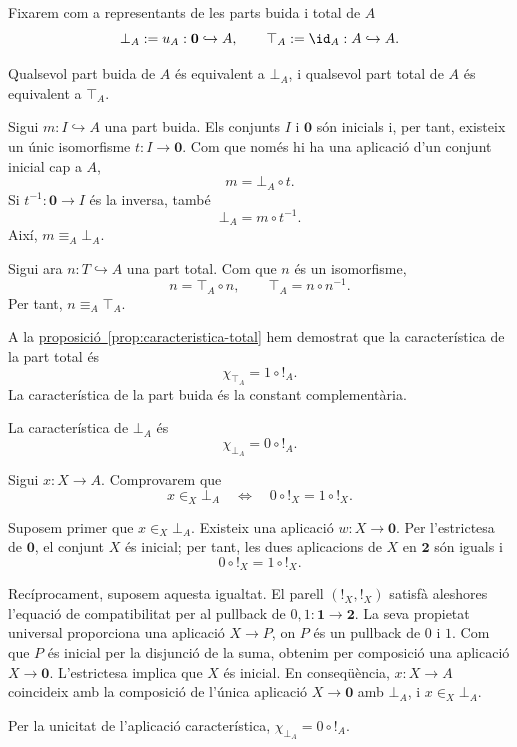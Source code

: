 \begin{notacio}\label{not:parts-extremals}
Fixarem com a representants de les parts buida i total de \(A\)
\[
\bot_A:=u_A:\mathbf0\hookrightarrow A,
\qquad
\top_A:=\id_A:A\hookrightarrow A.
\]
\end{notacio}

\begin{proposicio}\label{prop:parts-extremals-uniques}
Qualsevol part buida de \(A\) és equivalent a \(\bot_A\), i qualsevol
part total de \(A\) és equivalent a \(\top_A\).
\end{proposicio}

\begin{prova}
Sigui \(m:I\hookrightarrow A\) una part buida. Els conjunts \(I\) i
\(\mathbf0\) són inicials i, per tant, existeix un únic isomorfisme
\(t:I\to\mathbf0\). Com que només hi ha una aplicació d'un conjunt
inicial cap a \(A\),
\[
m=\bot_A\circ t.
\]
Si \(t^{-1}:\mathbf0\to I\) és la inversa, també
\[
\bot_A=m\circ t^{-1}.
\]
Així, \(m\equiv_A\bot_A\).

Sigui ara \(n:T\hookrightarrow A\) una part total. Com que \(n\) és un
isomorfisme,
\[
n=\top_A\circ n,
\qquad
\top_A=n\circ n^{-1}.
\]
Per tant, \(n\equiv_A\top_A\).
\end{prova}

A la \hyperref[prop:caracteristica-total]{proposició~\ref*{prop:caracteristica-total}} hem demostrat que la característica de la part total és
\[
\chi_{\top_A}=1\circ {!}_A.
\]
La característica de la part buida és la constant complementària.

\begin{proposicio}\label{prop:caracteristica-buida}
La característica de \(\bot_A\) és
\[
\chi_{\bot_A}=0\circ {!}_A.
\]
\end{proposicio}

\begin{prova}
Sigui \(x:X\to A\). Comprovarem que
\[
x\in_X\bot_A
\quad\Longleftrightarrow\quad
0\circ {!}_X=1\circ {!}_X.
\]

Suposem primer que \(x\in_X\bot_A\). Existeix una aplicació
\(w:X\to\mathbf0\). Per l'estrictesa de \(\mathbf0\), el conjunt
\(X\) és inicial; per tant, les dues aplicacions de \(X\) en
\(\mathbf2\) són iguals i
\[
0\circ {!}_X=1\circ {!}_X.
\]

Recíprocament, suposem aquesta igualtat. El parell
\(({!}_X,{!}_X)\) satisfà aleshores l'equació de compatibilitat per al pullback de
\(0,1:\mathbf1\to\mathbf2\). La seva propietat universal proporciona una aplicació \(X\to P\), on \(P\) és un pullback de \(0\) i \(1\). Com que \(P\) és inicial per la disjunció de la suma, obtenim per composició una aplicació \(X\to\mathbf0\). L'estrictesa implica que \(X\) és inicial. En
conseqüència, \(x:X\to A\) coincideix amb la composició de l'única
aplicació \(X\to\mathbf0\) amb \(\bot_A\), i
\(x\in_X\bot_A\).

Per la unicitat de l'aplicació característica,
\(\chi_{\bot_A}=0\circ {!}_A\).
\end{prova}

